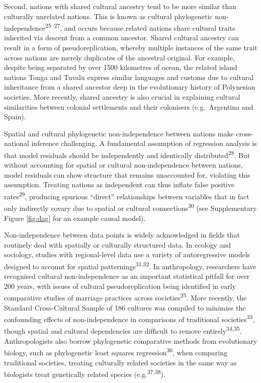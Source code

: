 \documentclass[english,man,floatsintext]{apa6}
\begin{document}
Second, nations with shared cultural ancestry tend to be more similar than culturally unrelated nations. This is known as cultural phylogenetic non-independence\textsuperscript{25--27}, and occurs because related nations share cultural traits inherited via descent from a common ancestor. Shared cultural ancestry can result in a form of pseudoreplication, whereby multiple instances of the same trait across nations are merely duplicates of the ancestral original. For example, despite being separated by over 1500 kilometres of ocean, the related island nations Tonga and Tuvalu express similar languages and customs due to cultural inheritance from a shared ancestor deep in the evolutionary history of Polynesian societies. More recently, shared ancestry is also crucial in explaining cultural similarities between colonial settlements and their colonisers (e.g.~Argentina and Spain).

Spatial and cultural phylogenetic non-independence between nations make cross-national inference challenging. A fundamental assumption of regression analysis is that model residuals should be independently and identically distributed\textsuperscript{28}. But without accounting for spatial or cultural non-independence between nations, model residuals can show structure that remains unaccounted for, violating this assumption. Treating nations as independent can thus inflate false positive rates\textsuperscript{29}, producing spurious \enquote{direct} relationships between variables that in fact only indirectly covary due to spatial or cultural connections\textsuperscript{30} (see Supplementary Figure \ref{fig:dag} for an example causal model).

Non-independence between data points is widely acknowledged in fields that routinely deal with spatially or culturally structured data. In ecology and sociology, studies with regional-level data use a variety of autoregressive models designed to account for spatial patternings\textsuperscript{31,32}. In anthropology, researchers have recognised cultural non-independence as an important statistical pitfall for over 200 years, with issues of cultural pseudoreplication being identified in early comparative studies of marriage practices across societies\textsuperscript{25}. More recently, the Standard Cross-Cultural Sample of 186 cultures was compiled to minimise the confounding effects of non-independence in comparisons of traditional societies\textsuperscript{33}, though spatial and cultural dependencies are difficult to remove entirely\textsuperscript{34,35}. Anthropologists also borrow phylogenetic comparative methods from evolutionary biology, such as phylogenetic least squares regression\textsuperscript{36}, when comparing traditional societies, treating culturally related societies in the same way as biologists treat genetically related species (e.g.\textsuperscript{37,38}).
\end{document}
